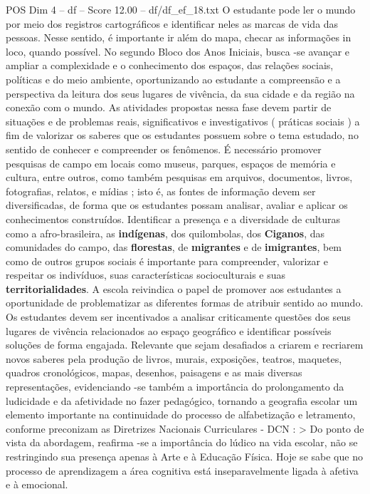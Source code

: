 \begin{textsample}{POS Dim 4 – df – Score 12.00 – df/df\_ef\_18.txt}
O estudante pode ler o mundo por meio dos registros cartográficos e identificar neles as marcas de vida das pessoas.
Nesse sentido, é importante ir além do mapa, checar as informações in loco, quando possível.
No segundo Bloco dos Anos Iniciais, busca -se avançar e ampliar a complexidade e o conhecimento dos espaços, das relações sociais, políticas e do meio ambiente, oportunizando ao estudante a compreensão e a perspectiva da leitura dos seus lugares de vivência, da sua cidade e da região na conexão com o mundo.
As atividades propostas nessa fase devem partir de situações e de problemas reais, significativos e investigativos ( práticas sociais ) a fim de valorizar os saberes que os estudantes possuem sobre o tema estudado, no sentido de conhecer e compreender os fenômenos.
É necessário promover pesquisas de campo em locais como museus, parques, espaços de memória e cultura, entre outros, como também pesquisas em arquivos, documentos, livros, fotografias, relatos, e mídias ; isto é, as fontes de informação devem ser diversificadas, de forma que os estudantes possam analisar, avaliar e aplicar os conhecimentos construídos.
Identificar a presença e a diversidade de culturas como a afro-brasileira, as \textbf{indígenas}, dos quilombolas, dos \textbf{Ciganos}, das comunidades do campo, das \textbf{florestas}, de \textbf{migrantes} e de \textbf{imigrantes}, bem como de outros grupos sociais é importante para compreender, valorizar e respeitar os indivíduos, suas características socioculturais e suas \textbf{territorialidades}.
A escola reivindica o papel de promover aos estudantes a oportunidade de problematizar as diferentes formas de atribuir sentido ao mundo.
Os estudantes devem ser incentivados a analisar criticamente questões dos seus lugares de vivência relacionados ao espaço geográfico e identificar possíveis soluções de forma engajada.
Relevante que sejam desafiados a criarem e recriarem novos saberes pela produção de livros, murais, exposições, teatros, maquetes, quadros cronológicos, mapas, desenhos, paisagens e as mais diversas representações, evidenciando -se também a importância do prolongamento da ludicidade e da afetividade no fazer pedagógico, tornando a geografia escolar um elemento importante na continuidade do processo de alfabetização e letramento, conforme preconizam as Diretrizes Nacionais Curriculares - DCN : > Do ponto de vista da abordagem, reafirma -se a importância do lúdico na vida escolar, não se restringindo sua presença apenas à Arte e à Educação Física.
Hoje se sabe que no processo de aprendizagem a área cognitiva está inseparavelmente ligada à afetiva e à emocional.

\end{textsample}
